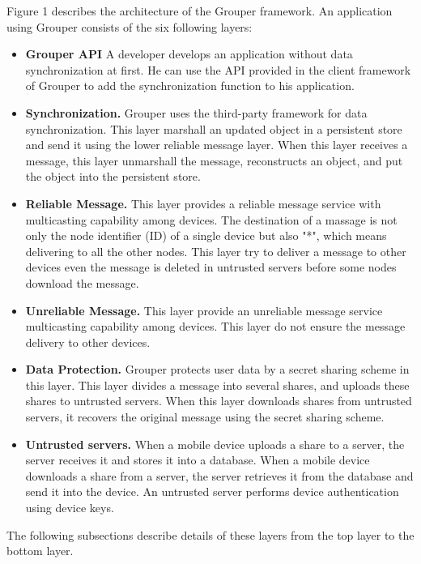 \documentclass[twocolumn,10pt]{article}
\begin{document}
Figure 1 describes the architecture of the Grouper framework. 
An application using Grouper consists of the six following layers:

\begin{itemize}
	\setlength{\itemsep}{1pt}
	\setlength{\parskip}{0pt}
	\setlength{\parsep}{0pt}
	\item \textbf{Grouper API}
	A developer develops an application without data synchronization at first. 
	He can use the API provided in the client framework of Grouper to add the synchronization function to his application.
	\item \textbf{Synchronization.} 
	Grouper uses the third-party framework for data synchronization.
	This layer marshall an updated object in a persistent store and send it using the lower reliable message layer.
	When this layer receives a message, this layer unmarshall the message, reconstructs an object, and put the object into the persistent store.
	\item \textbf{Reliable Message.}
	This layer provides a reliable message service with multicasting capability among devices.
	The destination of a massage is not only the node identifier (ID) of a single device but also "*", which means delivering to all the other nodes.
	This layer try to deliver a message to other devices even the message is deleted in untrusted servers before some nodes download the message.
	\item \textbf{Unreliable Message.}
	This layer provide an unreliable message service multicasting capability among devices.
	This layer do not ensure the message delivery to other devices.
	\item \textbf{Data Protection.}
	Grouper protects user data by a secret sharing scheme in this layer.
	This layer divides a message into several shares, and uploads these shares to untrusted servers.
	When this layer downloads shares from untrusted servers, it recovers the original message using the secret sharing scheme.
	\item \textbf{Untrusted servers.}
	When a mobile device uploads a share to a server, the server receives it and stores it into a database.
	When a mobile device downloads a share from a server, the server retrieves it from the database and send it into the device.
	An untrusted server performs device authentication using device keys.
\end{itemize}

The following subsections describe details of these layers from the top layer to the bottom layer.
\end{document}
